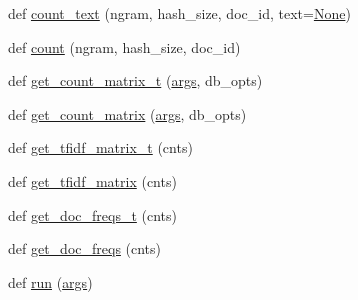 \begin{DoxyCompactItemize}
\item 
def \hyperlink{namespaceparlai_1_1agents_1_1tfidf__retriever_1_1build__tfidf_a76bae1c966a21d123cb91949d6c8ec20}{count\+\_\+text} (ngram, hash\+\_\+size, doc\+\_\+id, text=\hyperlink{namespaceparlai_1_1agents_1_1tfidf__retriever_1_1build__tfidf_ad50f77b70c0e27d3304395c58e9212c4}{None})
\item 
def \hyperlink{namespaceparlai_1_1agents_1_1tfidf__retriever_1_1build__tfidf_a7fc352c82f4a875b23fec3b046027039}{count} (ngram, hash\+\_\+size, doc\+\_\+id)
\item 
def \hyperlink{namespaceparlai_1_1agents_1_1tfidf__retriever_1_1build__tfidf_ac277ce99c037a483df09e82cfdbe4665}{get\+\_\+count\+\_\+matrix\+\_\+t} (\hyperlink{namespaceparlai_1_1agents_1_1tfidf__retriever_1_1build__tfidf_aa48318cbcc3882ee8fe371c672cbf941}{args}, db\+\_\+opts)
\item 
def \hyperlink{namespaceparlai_1_1agents_1_1tfidf__retriever_1_1build__tfidf_a0d95180be94e232e3ebc748c8aa7b9a0}{get\+\_\+count\+\_\+matrix} (\hyperlink{namespaceparlai_1_1agents_1_1tfidf__retriever_1_1build__tfidf_aa48318cbcc3882ee8fe371c672cbf941}{args}, db\+\_\+opts)
\item 
def \hyperlink{namespaceparlai_1_1agents_1_1tfidf__retriever_1_1build__tfidf_a3cd67edc9bfd76a8eeb49add2de75019}{get\+\_\+tfidf\+\_\+matrix\+\_\+t} (cnts)
\item 
def \hyperlink{namespaceparlai_1_1agents_1_1tfidf__retriever_1_1build__tfidf_acce651a5b40c5a3b4009181f22c69eaa}{get\+\_\+tfidf\+\_\+matrix} (cnts)
\item 
def \hyperlink{namespaceparlai_1_1agents_1_1tfidf__retriever_1_1build__tfidf_a284d006ecb031c337c64d7debe1407d3}{get\+\_\+doc\+\_\+freqs\+\_\+t} (cnts)
\item 
def \hyperlink{namespaceparlai_1_1agents_1_1tfidf__retriever_1_1build__tfidf_ac6883ed21006848661f6c748f91aff56}{get\+\_\+doc\+\_\+freqs} (cnts)
\item 
def \hyperlink{namespaceparlai_1_1agents_1_1tfidf__retriever_1_1build__tfidf_a0d8cca9dbdf0fa23d25e81ec2a96b347}{run} (\hyperlink{namespaceparlai_1_1agents_1_1tfidf__retriever_1_1build__tfidf_aa48318cbcc3882ee8fe371c672cbf941}{args})
\end{DoxyCompactItemize}
